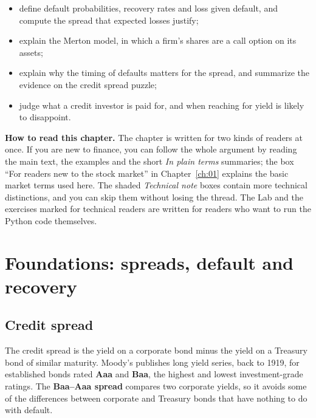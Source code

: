 \begin{itemize}
  \item define default probabilities, recovery rates and loss given default, and compute the spread that expected losses justify;
  \item explain the Merton model, in which a firm's shares are a call option on its assets;
  \item explain why the timing of defaults matters for the spread, and summarize the evidence on the credit spread puzzle;
  \item judge what a credit investor is paid for, and when reaching for yield is likely to disappoint.
\end{itemize}

\begin{callout}
\textbf{How to read this chapter.} The chapter is written for two kinds of readers at once. If you are new to finance, you can follow the whole argument by reading the main text, the examples and the short \emph{In plain terms} summaries; the box ``For readers new to the stock market'' in Chapter~\ref{ch:01} explains the basic market terms used here. The shaded \emph{Technical note} boxes contain more technical distinctions, and you can skip them without losing the thread. The Lab and the exercises marked for technical readers are written for readers who want to run the Python code themselves.
\end{callout}

\section{Foundations: spreads, default and recovery}
\label{sec:15-foundations}

\subsection{Credit spread}

The credit spread is the yield on a corporate bond minus the yield on a Treasury bond of similar maturity. Moody's publishes long yield series, back to 1919, for established bonds rated \textbf{Aaa} and \textbf{Baa}, the highest and lowest investment-grade ratings. The \textbf{Baa--Aaa spread} compares two corporate yields, so it avoids some of the differences between corporate and Treasury bonds that have nothing to do with default.

